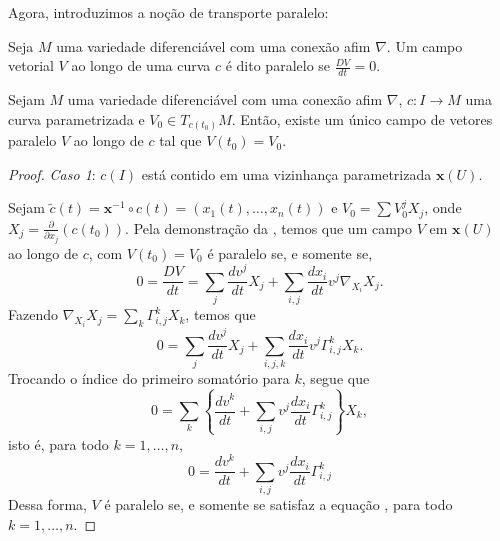 Agora, introduzimos a noção de transporte paralelo:
\begin{definition}
	\label{def:paralelismo}
	Seja $M$ uma variedade diferenciável com uma conexão afim $\nabla$. Um campo vetorial $V$ ao longo de uma curva $c$ é dito paralelo se $\frac{DV}{dt}=0$.
\end{definition}
\begin{proposition}
	\label{prop:transporte-paralelo}
	Sejam $M$ uma variedade diferenciável com uma conexão afim $\nabla$, $c:I\to M$ uma curva parametrizada e $V_{0} \in T_{c(t_{0})}M$. Então, existe um único campo de vetores paralelo $V$ ao longo de $c$ tal que $V(t_{0})=V_{0}$.
	\begin{proof}

		\emph{Caso 1}: $c(I)$ está contido em uma vizinhança parametrizada $\mathbf{x}(U)$.

		Sejam $\tilde{c}(t)=\mathbf{x}^{-1} \circ c(t) = (x_{1}(t), \dots, x_{n}(t))$ e $V_{0}=\sum V_{0}^{j}X_{j}$, onde $X_{j}=\frac{\partial}{\partial x_{j}}(c(t_{0}))$.
		Pela demonstração da , temos que um campo $V$ em $\mathbf{x}(U)$ ao longo de $c$, com $V(t_{0})=V_{0}$ é paralelo se, e somente se,
		\begin{equation*}
			0=\frac{DV}{dt}=\sum_{j}\frac{dv^{j}}{dt}X_{j}+\sum_{i,j}\frac{dx_{i}}{dt}v^{j}\nabla_{X_{i}}X_{j}.
		\end{equation*}
		Fazendo $\nabla_{X_{i}}X_{j}=\sum_{k}\Gamma_{i,j}^{k}X_{k}$, temos que
		\begin{equation*}
			0=\sum_{j}\frac{dv^{j}}{dt}X_{j}+\sum_{i,j,k}\frac{dx_{i}}{dt}v^{j}\Gamma_{i,j}^{k}X_{k}.
		\end{equation*}
		Trocando o índice do primeiro somatório para $k$, segue que
		\begin{equation*}
			0=\sum_{k}\left\{  \frac{dv^{k}}{dt}+\sum_{i,j}v^{j}\frac{dx_{i}}{dt}\Gamma_{i,j}^{k}  \right\}X_{k},
		\end{equation*}
		isto é, para todo $k=1, \dots, n$,
		\begin{equation}
			\label{eq:covariant}
			0=\frac{dv^{k}}{dt}+\sum_{i,j}v^{j}\frac{dx_{i}}{dt}\Gamma_{i,j}^{k}
		\end{equation}
		Dessa forma, $V$ é paralelo se, e somente se satisfaz a equação , para todo $k=1, \ldots, n$.


\end{proof}
\end{proposition}
